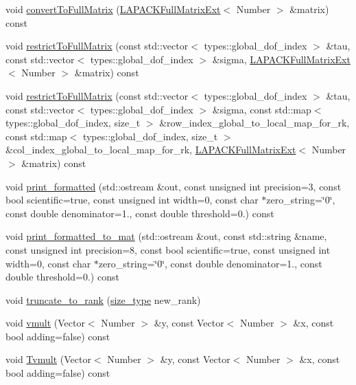\begin{DoxyCompactItemize}
\item 
void \hyperlink{classRkMatrix_a384cdf3033d98f90b80d373add20b556}{convert\+To\+Full\+Matrix} (\hyperlink{classLAPACKFullMatrixExt}{L\+A\+P\+A\+C\+K\+Full\+Matrix\+Ext}$<$ Number $>$ \&matrix) const
\item 
void \hyperlink{classRkMatrix_a5305306386e47bcded819ce8d7f7935c}{restrict\+To\+Full\+Matrix} (const std\+::vector$<$ types\+::global\+\_\+dof\+\_\+index $>$ \&tau, const std\+::vector$<$ types\+::global\+\_\+dof\+\_\+index $>$ \&sigma, \hyperlink{classLAPACKFullMatrixExt}{L\+A\+P\+A\+C\+K\+Full\+Matrix\+Ext}$<$ Number $>$ \&matrix) const
\item 
void \hyperlink{classRkMatrix_a0c529b22a8a38c4046a93c4a16ad39ca}{restrict\+To\+Full\+Matrix} (const std\+::vector$<$ types\+::global\+\_\+dof\+\_\+index $>$ \&tau, const std\+::vector$<$ types\+::global\+\_\+dof\+\_\+index $>$ \&sigma, const std\+::map$<$ types\+::global\+\_\+dof\+\_\+index, size\+\_\+t $>$ \&row\+\_\+index\+\_\+global\+\_\+to\+\_\+local\+\_\+map\+\_\+for\+\_\+rk, const std\+::map$<$ types\+::global\+\_\+dof\+\_\+index, size\+\_\+t $>$ \&col\+\_\+index\+\_\+global\+\_\+to\+\_\+local\+\_\+map\+\_\+for\+\_\+rk, \hyperlink{classLAPACKFullMatrixExt}{L\+A\+P\+A\+C\+K\+Full\+Matrix\+Ext}$<$ Number $>$ \&matrix) const
\item 
void \hyperlink{classRkMatrix_aeccb86734649be94a64d76cb613eea79}{print\+\_\+formatted} (std\+::ostream \&out, const unsigned int precision=3, const bool scientific=true, const unsigned int width=0, const char $\ast$zero\+\_\+string=\char`\"{}0\char`\"{}, const double denominator=1., const double threshold=0.) const
\item 
void \hyperlink{classRkMatrix_ada4d32bb08cce5d5e41ee4673bc88e00}{print\+\_\+formatted\+\_\+to\+\_\+mat} (std\+::ostream \&out, const std\+::string \&name, const unsigned int precision=8, const bool scientific=true, const unsigned int width=0, const char $\ast$zero\+\_\+string=\char`\"{}0\char`\"{}, const double denominator=1., const double threshold=0.) const
\item 
void \hyperlink{classRkMatrix_a555e0c3184b8411db1350c8fe1e875a0}{truncate\+\_\+to\+\_\+rank} (\hyperlink{classRkMatrix_add060bfc3a4cc77f858c3d6dd58cadd5}{size\+\_\+type} new\+\_\+rank)
\item 
void \hyperlink{classRkMatrix_a25753b7f6d82dca931992cd975165972}{vmult} (Vector$<$ Number $>$ \&y, const Vector$<$ Number $>$ \&x, const bool adding=false) const
\item 
void \hyperlink{classRkMatrix_a7162dd0c4580dbb5e98715d9b8dd56c1}{Tvmult} (Vector$<$ Number $>$ \&y, const Vector$<$ Number $>$ \&x, const bool adding=false) const

\end{DoxyCompactItemize}
